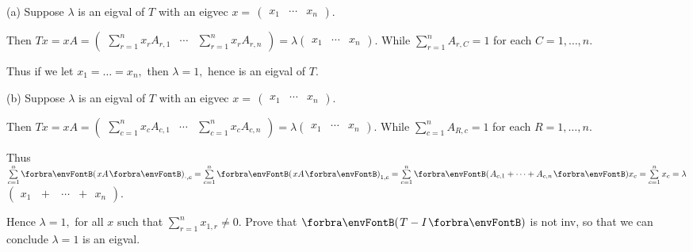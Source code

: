 \documentclass[a4paper, 11pt, UTF8]{article}
\begin{document}
\begin{large}
\par\quad
(a) Suppose $\lambda$ is an eigval of $T$ with an eigvec $x=\,${\small$\begin{pmatrix}
x_1 & \cdots & x_n
\end{pmatrix}.$}\par\quad\Ha
Then {\small$Tx=xA=\begin{pmatrix} \sum\limits_{r=1}^n x_r A_{r,1} &\cdots & \sum\limits_{r=1}^n x_r A_{r,n}\end{pmatrix}=\lambda \begin{pmatrix} x_1 & \cdots & x_n\end{pmatrix}.$} While $\sum\limits_{r=1}^n A_{r,C}=1$ for each $C=1,\dots,n.$\par\quad\Ha
Thus if we let $x_1=\dots=x_n,$ then $\lambda=1,$ hence is an eigval of $T.$\par\quad
(b) Suppose $\lambda$ is an eigval of $T$ with an eigvec $x=\,${\small$\begin{pmatrix}
x_1 & \cdots & x_n
\end{pmatrix}.$}\par\quad\Hb
Then {\small$Tx=xA=\begin{pmatrix} \sum\limits_{c=1}^n x_c A_{c,1} &\cdots & \sum\limits_{c=1}^n x_c A_{c,n}\end{pmatrix}=\lambda \begin{pmatrix} x_1 & \cdots & x_n\end{pmatrix}.$} While $\sum\limits_{c=1}^n A_{R,c}=1$ for each $R=1,\dots,n.$\par\quad\Hb
Thus $\sum\limits_{c=1}^n \Par{xA}_{\cdot,c}=\sum\limits_{c=1}^n \Par{xA}_{1,c}=\sum\limits_{c=1}^n\Par{A_{c,1}+\dots+A_{c,n}}x_c=\sum\limits_{c=1}^n x_c=\lambda${\small$\begin{pmatrix}
x_1\,\,\,\,+&\cdots&+\,\,\,\,x_n\end{pmatrix}.$}\par\quad\Hb
Hence $\lambda=1,$ for all $x$ such that $\sum\limits_{r=1}^n x_{1,r}\neq 0.$\PfEnd\vspace{6pt}\quad\Hb
\Or Prove that $\Par{T-I}$ is not inv, so that we can conclude $\lambda=1$ is an eigval.\par\quad\Hb

\end{large}
\end{document}
